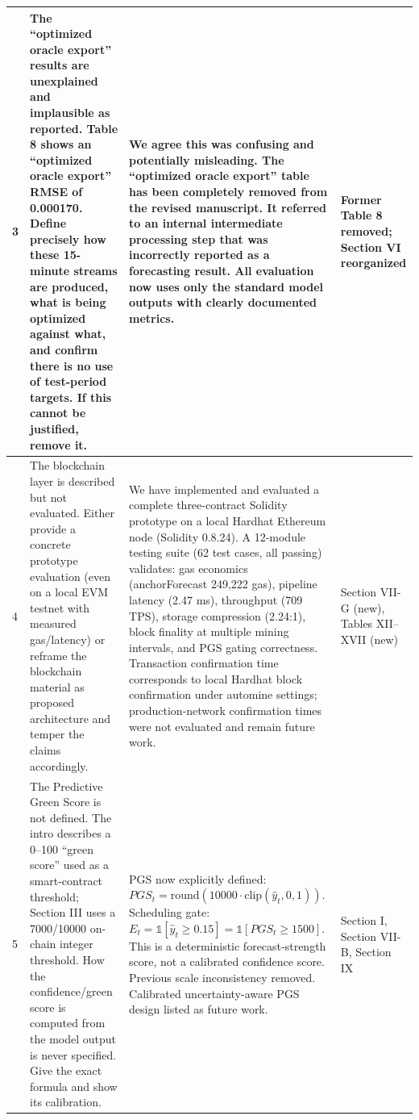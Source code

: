 \documentclass[11pt,a4paper]{article}
\begin{document}
\begin{longtable}{|p{1.5cm}|p{3.5cm}|p{6.2cm}|p{2.8cm}|}
3 & The ``optimized oracle export'' results are unexplained and implausible as reported. Table 8 shows an ``optimized oracle export'' RMSE of 0.000170. Define precisely how these 15-minute streams are produced, what is being optimized against what, and confirm there is no use of test-period targets. If this cannot be justified, remove it. & We agree this was confusing and potentially misleading. The ``optimized oracle export'' table has been completely removed from the revised manuscript. It referred to an internal intermediate processing step that was incorrectly reported as a forecasting result. All evaluation now uses only the standard model outputs with clearly documented metrics. & Former Table 8 removed; Section VI reorganized \\
\hline

4 & The blockchain layer is described but not evaluated. Either provide a concrete prototype evaluation (even on a local EVM testnet with measured gas/latency) or reframe the blockchain material as proposed architecture and temper the claims accordingly. & We have implemented and evaluated a complete three-contract Solidity prototype on a local Hardhat Ethereum node (Solidity 0.8.24). A 12-module testing suite (62 test cases, all passing) validates: gas economics (anchorForecast 249,222 gas), pipeline latency (2.47 ms), throughput (709 TPS), storage compression (2.24:1), block finality at multiple mining intervals, and PGS gating correctness. Transaction confirmation time corresponds to local Hardhat block confirmation under automine settings; production-network confirmation times were not evaluated and remain future work. & Section VII-G (new), Tables XII--XVII (new) \\
\hline

5 & The Predictive Green Score is not defined. The intro describes a 0--100 ``green score'' used as a smart-contract threshold; Section III uses a 7000/10000 on-chain integer threshold. How the confidence/green score is computed from the model output is never specified. Give the exact formula and show its calibration. & PGS now explicitly defined: $PGS_t = \text{round}(10000 \cdot \text{clip}(\hat{y}_t, 0, 1))$. Scheduling gate: $E_t = \mathbb{1}[\hat{y}_t \ge 0.15] = \mathbb{1}[PGS_t \ge 1500]$. This is a deterministic forecast-strength score, not a calibrated confidence score. Previous scale inconsistency removed. Calibrated uncertainty-aware PGS design listed as future work. & Section I, Section VII-B, Section IX \\
\hline


\end{longtable}
\end{document}
